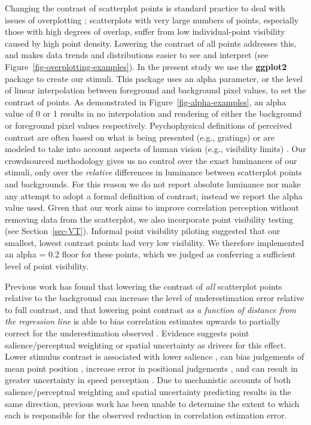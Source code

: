 \documentclass[manuscript, review, anonymous, screen]{acmart}
\begin{document}
Changing the contrast of scatterplot points is standard practice to deal
with issues of overplotting \citep{matejka_2015, bertini_2004};
scatterplots with very large numbers of points, especially those with
high degrees of overlap, suffer from low individual-point visibility
caused by high point density. Lowering the contrast of all points
addresses this, and makes data trends and distributions easier to see
and interpret (see Figure~\ref{fig-overplotting-examples}). In the
present study we use the \textbf{ggplot2} package \citep{hadley_gg2016}
to create our stimuli. This package uses an alpha parameter, or the
level of linear interpolation \citep{stone_2008} between foreground and
background pixel values, to set the contrast of points. As demonstrated
in Figure~\ref{fig-alpha-examples}, an alpha value of 0 or 1 results in
no interpolation and rendering of either the background or foreground
pixel values respectively. Psychophysical definitions of perceived
contrast are often based on what is being presented (e.g., gratings) or
are modeled to take into account aspects of human vision (e.g.,
visibility limits) \citep{zuffi_2007}. Our crowdsourced methodology
gives us no control over the exact luminances of our stimuli, only over
the \emph{relative} differences in luminance between scatterplot points
and backgrounds. For this reason we do not report absolute luminance nor
make any attempt to adopt a formal definition of contrast; instead we
report the alpha value used. Given that our work aims to improve
correlation perception without removing data from the scatterplot, we
also incorporate point visibility testing (see Section~\ref{sec-VT}).
Informal point visibility piloting suggested that our smallest, lowest
contrast points had very low visibility. We therefore implemented an
alpha = 0.2 floor for these points, which we judged as conferring a
sufficient level of point visibility.

Previous work has found that lowering the contrast of \emph{all}
scatterplot points relative to the background can increase the level of
underestimation error relative to full contrast, and that lowering point
contrast \emph{as a function of distance from the regression line} is
able to bias correlation estimates upwards to partially correct for the
underestimation observed \citep{strain_2023}. Evidence suggests point
salience/perceptual weighting or spatial uncertainty as drivers for this
effect. Lower stimulus contrast is associated with lower salience
\citep{healey_2011}, can bias judgements of mean point position
\citep{hong_2021}, increase error in positional judgements
\citep{wehrhahn_1990}, and can result in greater uncertainty in speed
perception \citep{champion_2017}. Due to mechanistic accounts of both
salience/perceptual weighting and spatial uncertainty predicting results
in the same direction, previous work \citep{strain_2023} has been unable
to determine the extent to which each is responsible for the observed
reduction in correlation estimation error.
\end{document}
